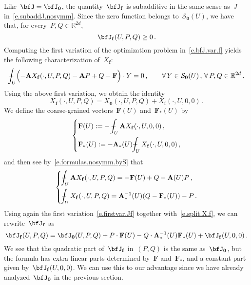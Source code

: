 \documentclass[11pt,twoside]{article} %
\numberwithin{equation}{section}
\theoremstyle{definition}
\let\originalleft\left
\let\originalright\right
\renewcommand{\left}{\mathopen{}\mathclose\bgroup\originalleft}
\renewcommand{\right}{\aftergroup\egroup\originalright}
\newcommand*{\R}{\ensuremath{\mathbb{R}}}
\newcommand{\f}{\mathbf{f}}
\newcommand{\bfzero}{\boldsymbol{0}}
\renewcommand{\S}{\mathcal{S}}
\def\Xint#1{\mathchoice
{\XXint\displaystyle\textstyle{#1}}%
{\XXint\textstyle\scriptstyle{#1}}%
{\XXint\scriptstyle\scriptscriptstyle{#1}}%
{\XXint\scriptscriptstyle\scriptscriptstyle{#1}}%
\!\int}
\def\XXint#1#2#3{{\setbox0=\hbox{$#1{#2#3}{\int}$}
\vcenter{\hbox{$#2#3$}}\kern-.5\wd0}}
\def\fint{\Xint-}
\newcommand{\bfA}{\mathbf{A}}
\newcommand{\bfF}{\mathbf{F}}
\begin{document}
\smallskip

Like~$\bfJ=\bfJ_{\bfzero}$, the quantity~$\bfJ_{\f}$ is subadditive in the same sense as~$J$ in~\eqref{e.subaddJ.nosymm}. 
Since the zero function belongs to~$\S_{\bfzero}(U)$, we have that, for every~$P,Q\in \R^{2d}$,  
\begin{equation}
\label{e.bfJ.nonneg}
\bfJ_{\f}(U,P,Q) \geq 0\,.
\end{equation}
Computing the first variation of the optimization problem in~\eqref{e.bfJ.var.f} yields the following characterization of~$X_{\f}$:
\begin{equation}
\label{e.firstvar.Jf}
\fint_U 
\Bigl( 
- \bfA X_{\f}(\cdot,U,P,Q) 
-\bfA P
+Q-\bfF
\Bigr)\cdot Y = 0\,, 
\qquad \forall \,  Y \in \S_{\bfzero}(U)\,, \, \forall \, P,Q\in \R^{2d}\,.
\end{equation}
Using the above first variation, we obtain the identity 
\begin{equation} 
\label{e.split.X.f}
X_{\f}(\cdot,U,P,Q)  
= 
X_{\bfzero}(\cdot,U,P,Q) + X_{\f}(\cdot,U,0,0) 
\,.
\end{equation}
We define the coarse-grained vectors~$\bfF(U)$ and~$\bfF_*(U)$ by 
\begin{equation} \label{e.coarseF.def}
\left\{
\begin{aligned}
& \bfF(U) 
:=
-\,
\fint_{U} \bfA X_{\f}(\cdot,U,0,0) \,,
\\ & 
\bfF_*(U) 
:=
-\bfA_*(U) \fint_{U} X_{\f}(\cdot,U,0,0) \,,
\end{aligned}
\right.
\end{equation}
and then see by~\eqref{e.formulas.nosymm.byS} that
\begin{equation} 
\label{e.average.X.f}
\left\{
\begin{aligned}
&\fint_{U} \bfA X_{\f}(\cdot,U,P,Q) 
 =
-\bfF(U) + Q - \bfA(U) P\,, \\
& \fint_{U} X_{\f}(\cdot,U,P,Q) = \bfA_*^{-1}(U) (Q - \bfF_*(U)) - P \,.  
\end{aligned}
\right.
\end{equation}
Using again the first variation~\eqref{e.firstvar.Jf} together with~\eqref{e.split.X.f}, we can rewrite~$\bfJ_{\f}$ as
\begin{equation} 
\label{e.Jf.repre0}
\bfJ_{\f}(U, P,Q ) 
=  
\bfJ_{\bfzero}(U, P,Q )  
+ P\cdot \bfF(U) 
- Q \cdot \bfA_*^{-1}(U) \bfF_*(U)  
+ \bfJ_{\f}(U, 0,0) 
\,.
\end{equation}
We see that the quadratic part of~$\bfJ_{\f}$ in~$(P,Q)$ is the same as~$\bfJ_{\bfzero}$, but the formula has extra linear parts determined by~$\bfF$ and~$\bfF_*$, and a constant part given by~$\bfJ_{\f}(U,0,0)$. We can use this to our advantage since we have already analyzed~$\bfJ_{\bfzero}$ in the previous section. 
\end{document}
